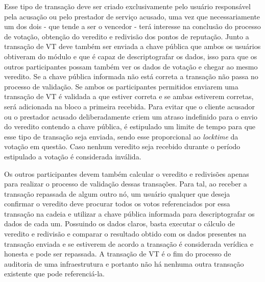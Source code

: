 
%

%

%
Esse tipo de transação deve ser criado exclusivamente pelo usuário responsável pela acusação ou pelo prestador de serviço acusado, uma vez que necessariamente um dos dois - que tende a ser o vencedor - terá interesse na conclusão do processo de votação, obtenção do veredito e redivisão dos pontos de reputação. Junto a transação de \ac{VT} deve também ser enviada a chave pública que ambos os usuários obtiveram do módulo e que é capaz de descriptografar os dados, isso para que os outros participantes possam também ver os dados de votação e chegar ao mesmo veredito. Se a chave pública informada não está correta a transação não passa no processo de validação. Se ambos os participantes permitidos enviarem uma transação de \ac{VT} é validada a que estiver correta e se ambas estiverem corretas, será adicionada na bloco a primeira recebida. 
%
%
%
Para evitar que o cliente acusador ou o prestador acusado deliberadamente criem um atraso indefinido para o envio do veredito contendo a chave pública, é estipulado um limite de tempo para que esse tipo de transação seja enviada, sendo esse proporcional ao \textit{locktime} da votação em questão. Caso nenhum veredito seja recebido durante o período estipulado a votação é considerada inválida.

%
Os outros participantes devem também calcular o veredito e redivisões apenas para realizar o processo de validação dessas transações. Para tal, ao receber a transação repassada de algum outro nó, um usuário qualquer que deseja confirmar o veredito deve procurar todos os votos referenciados por essa transação na cadeia e utilizar a chave pública informada para descriptografar os dados de cada um. Possuindo os dados claros, basta executar o cálculo de veredito e redivisão e comparar o resultado obtido com os dados presentes na transação enviada e se estiverem de acordo a transação é considerada verídica e honesta e pode ser repassada. A transação de \ac{VT} é o fim do processo de auditoria de uma infraestrutura e portanto não há nenhuma outra transação existente que pode referenciá-la.


